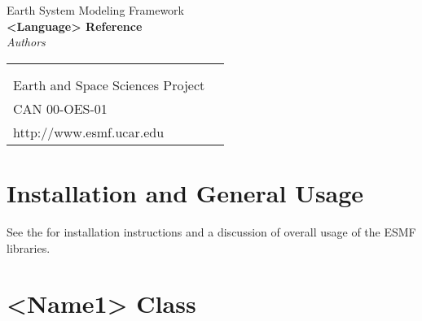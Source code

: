 \documentclass[]{article}
\begin{document}

\begin{titlepage}

\begin{center}
{\Large Earth System Modeling Framework } \\
\vspace{.25in}
{\Large {\bf <Module, Library, Component or Model Name> <Language> Reference}} \\
\vspace{.25in}
{\large {\it Authors}}
\vspace{.5in}
\end{center}

\begin{latexonly}
\vspace{5.5in}
\begin{tabular}{p{5in}p{.9in}}
\hrulefill \\
\noindent {\bf NASA High Performance Computing and Communications Program} \\
\noindent Earth and Space Sciences Project \\
\noindent CAN 00-OES-01 \\
\noindent http://www.esmf.ucar.edu \\
\end{tabular}
\end{latexonly}

\end{titlepage}

\tableofcontents

\newpage


\section{Installation and General Usage}
See the  for installation instructions and a discussion of overall 
usage of the ESMF libraries.



\newpage
\section{<Name1> Class}
\end{document}
